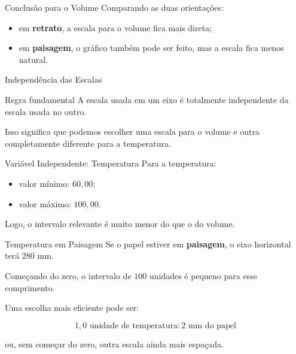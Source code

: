 \documentclass[aspectratio=169]{beamer}
\begin{document}
\begin{frame}{Conclusão para o Volume}
Comparando as duas orientações:

\begin{itemize}
\item em \textbf{retrato}, a escala para o volume fica mais direta;
\item em \textbf{paisagem}, o gráfico também pode ser feito, mas a escala fica menos natural.
\end{itemize}
\end{frame}

\begin{frame}{Independência das Escalas}
\begin{alertblock}{Regra fundamental}
A escala usada em um eixo é totalmente independente da escala usada no outro.
\end{alertblock}

Isso significa que podemos escolher uma escala para o volume e outra completamente diferente para a temperatura.
\end{frame}

\begin{frame}{Variável Independente: Temperatura}
Para a temperatura:

\begin{itemize}
\item valor mínimo: \(60{,}00\);
\item valor máximo: \(100{,}00\).
\end{itemize}

Logo, o intervalo relevante é muito menor do que o do volume.
\end{frame}

\begin{frame}{Temperatura em Paisagem}
Se o papel estiver em \textbf{paisagem}, o eixo horizontal terá \(280\) mm.

\bigskip

Começando do zero, o intervalo de \(100\) unidades é pequeno para esse comprimento.

\bigskip

Uma escolha mais eficiente pode ser:

\begin{equation}
1{,}0 \text{ unidade de temperatura} : 2 \text{ mm do papel}
\end{equation}

ou, sem começar do zero, outra escala ainda mais espaçada.
\end{frame}
\end{document}
